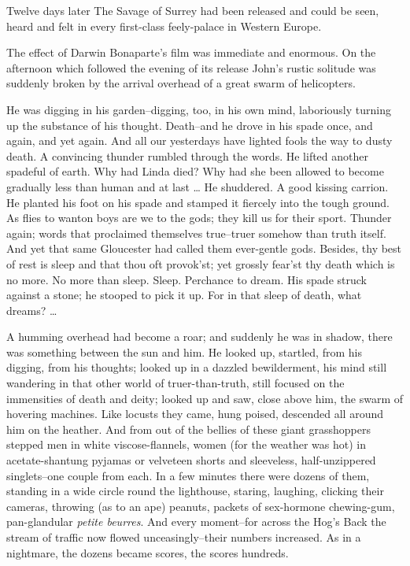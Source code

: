 \documentclass[12pt]{report}
\begin{document}
Twelve days later The Savage of Surrey had been released and could be
seen, heard and felt in every first-class feely-palace in Western
Europe.

The effect of Darwin Bonaparte's film was immediate and enormous. On the
afternoon which followed the evening of its release John's rustic
solitude was suddenly broken by the arrival overhead of a great swarm of
helicopters.

He was digging in his garden--digging, too, in his own mind, laboriously
turning up the substance of his thought. Death--and he drove in his
spade once, and again, and yet again. And all our yesterdays have
lighted fools the way to dusty death. A convincing thunder rumbled
through the words. He lifted another spadeful of earth. Why had Linda
died? Why had she been allowed to become gradually less than human and
at last \ldots{} He shuddered. A good kissing carrion. He planted his
foot on his spade and stamped it fiercely into the tough ground. As
flies to wanton boys are we to the gods; they kill us for their sport.
Thunder again; words that proclaimed themselves true--truer somehow than
truth itself. And yet that same Gloucester had called them ever-gentle
gods. Besides, thy best of rest is sleep and that thou oft provok'st;
yet grossly fear'st thy death which is no more. No more than sleep.
Sleep. Perchance to dream. His spade struck against a stone; he stooped
to pick it up. For in that sleep of death, what dreams? \ldots{}

A humming overhead had become a roar; and suddenly he was in shadow,
there was something between the sun and him. He looked up, startled,
from his digging, from his thoughts; looked up in a dazzled
bewilderment, his mind still wandering in that other world of
truer-than-truth, still focused on the immensities of death and deity;
looked up and saw, close above him, the swarm of hovering machines. Like
locusts they came, hung poised, descended all around him on the heather.
And from out of the bellies of these giant grasshoppers stepped men in
white viscose-flannels, women (for the weather was hot) in
acetate-shantung pyjamas or velveteen shorts and sleeveless,
half-unzippered singlets--one couple from each. In a few minutes there
were dozens of them, standing in a wide circle round the lighthouse,
staring, laughing, clicking their cameras, throwing (as to an ape)
peanuts, packets of sex-hormone chewing-gum, pan-glandular \emph{petite
beurres}. And every moment--for across the Hog's Back the stream of
traffic now flowed unceasingly--their numbers increased. As in a
nightmare, the dozens became scores, the scores hundreds.
\end{document}
